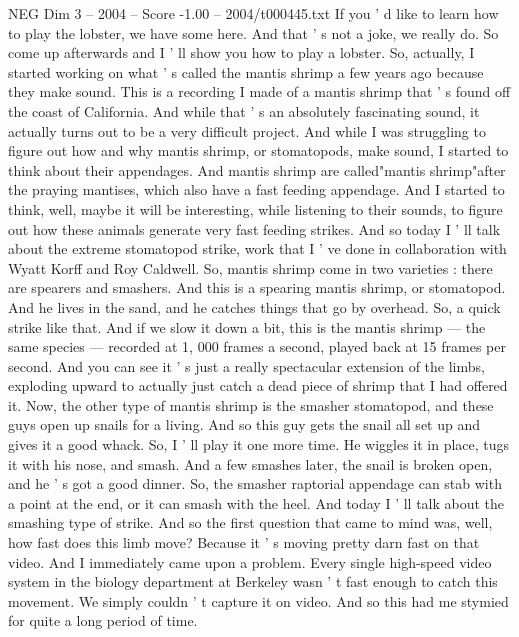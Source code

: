 \begin{textsample}{NEG Dim 3 – 2004 – Score -1.00 – 2004/t000445.txt}  \label{ex:f3_neg_012}
If you ' d like to learn how to play the lobster, we have some here.
And that ' s not a joke, we really do.
So come up afterwards and I ' ll show you how to play a lobster.
So, actually, I started working on what ' s called the mantis shrimp a few years ago because they make sound.
This is a recording I made of a mantis shrimp that ' s found off the coast of California.
And while that ' s an absolutely fascinating sound, it actually turns out to be a very difficult project.
And while I was struggling to figure out how and why mantis shrimp, or stomatopods, make sound, I started to think about their appendages.
And mantis shrimp are called"mantis shrimp"after the praying mantises, which also have a fast feeding appendage.
And I started to think, well, maybe it will be interesting, while listening to their sounds, to figure out how these animals generate very fast feeding strikes.
And so today I ' ll talk about the extreme stomatopod strike, work that I ' ve done in collaboration with Wyatt Korff and Roy Caldwell.
So, mantis shrimp come in two varieties : there are spearers and smashers.
And this is a spearing mantis shrimp, or stomatopod.
And he lives in the sand, and he catches things that go by overhead.
So, a quick strike like that.
And if we slow it down a bit, this is the mantis shrimp — the same species — recorded at 1, 000 frames a second, played back at 15 frames per second.
And you can see it ' s just a really spectacular extension of the limbs, exploding upward to actually just catch a dead piece of shrimp that I had offered it.
Now, the other type of mantis shrimp is the smasher stomatopod, and these guys open up snails for a living.
And so this guy gets the snail all set up and gives it a good whack.
So, I ' ll play it one more time.
He wiggles it in place, tugs it with his nose, and smash.
And a few smashes later, the snail is broken open, and he ' s got a good dinner.
So, the smasher raptorial appendage can stab with a point at the end, or it can smash with the heel.
And today I ' ll talk about the smashing type of strike.
And so the first question that came to mind was, well, how fast does this limb move?
Because it ' s moving pretty darn fast on that video.
And I immediately came upon a problem.
Every single high-speed video system in the biology department at Berkeley wasn ' t fast enough to catch this movement.
We simply couldn ' t capture it on video.
And so this had me stymied for quite a long period of time.

\end{textsample}
